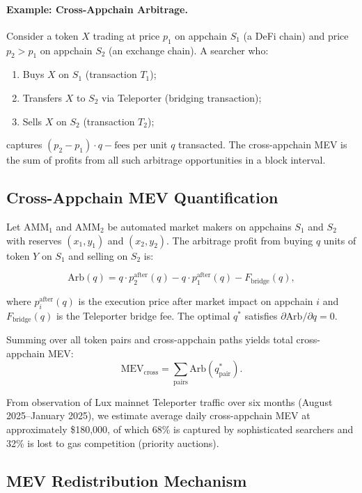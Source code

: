 \documentclass[11pt]{article}
\begin{document}
\paragraph{Example: Cross-Appchain Arbitrage.}
Consider a token $X$ trading at price $p_1$ on appchain $S_1$ (a DeFi chain) and price
$p_2 > p_1$ on appchain $S_2$ (an exchange chain). A searcher who:
\begin{enumerate}[leftmargin=1.5em]
  \item Buys $X$ on $S_1$ (transaction $T_1$);
  \item Transfers $X$ to $S_2$ via Teleporter (bridging transaction);
  \item Sells $X$ on $S_2$ (transaction $T_2$);
\end{enumerate}
captures $(p_2 - p_1) \cdot q - \text{fees}$ per unit $q$ transacted. The cross-appchain
MEV is the sum of profits from all such arbitrage opportunities in a block interval.

\subsection{Cross-Appchain MEV Quantification}

Let $\text{AMM}_1$ and $\text{AMM}_2$ be automated market makers on appchains $S_1$ and
$S_2$ with reserves $(x_1, y_1)$ and $(x_2, y_2)$. The arbitrage profit from buying $q$
units of token $Y$ on $S_1$ and selling on $S_2$ is:

\begin{equation}
\text{Arb}(q) = q \cdot p_2^{\text{after}}(q) - q \cdot p_1^{\text{after}}(q) - F_{\text{bridge}}(q),
\label{eq:arb}
\end{equation}

where $p_i^{\text{after}}(q)$ is the execution price after market impact on appchain $i$
and $F_{\text{bridge}}(q)$ is the Teleporter bridge fee. The optimal $q^*$ satisfies
$\partial \text{Arb}/\partial q = 0$.

Summing over all token pairs and cross-appchain paths yields total cross-appchain MEV:
\[
  \text{MEV}_{\text{cross}} = \sum_{\text{pairs}} \text{Arb}(q^*_{\text{pair}}).
\]

From observation of Lux mainnet Teleporter traffic over six months (August 2025--January
2025), we estimate average daily cross-appchain MEV at approximately \$180,000, of which
68\% is captured by sophisticated searchers and 32\% is lost to gas competition
(priority auctions).

\subsection{MEV Redistribution Mechanism}
\end{document}
